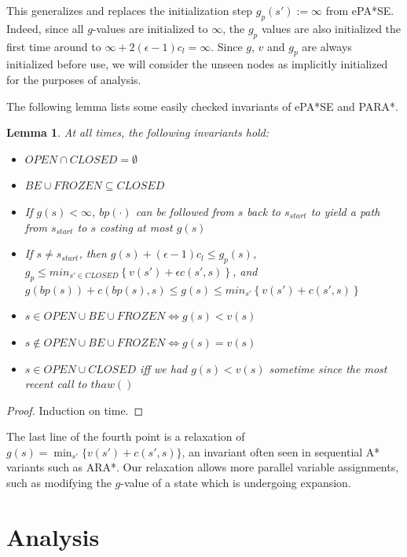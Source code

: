 \documentclass[letterpaper]{article}
\newtheorem{lemma}{Lemma}
\begin{document}
This generalizes and replaces the initialization step $g_p(s') := \infty$ from ePA*SE. Indeed, since all $g$-values are initialized to $\infty$, the $g_p$ values are also initialized the first time around to $\infty +2(\epsilon-1)c_l = \infty$. Since $g$, $v$ and $g_p$ are always initialized before use, we will consider the unseen nodes as implicitly initialized for the purposes of analysis.

The following lemma lists some easily checked invariants of ePA*SE and PARA*.

\begin{lemma}
\label{lem:prop}
At all times, the following invariants hold:
\begin{itemize}
\item $OPEN\cap CLOSED = \emptyset$
\item $BE\cup FROZEN \subseteq CLOSED$
\item If $g(s)<\infty$, $bp(\cdot)$ can be followed from $s$ back to $s_{start}$ to yield a path from $s_{start}$ to $s$ costing at most $g(s)$
\item If $s\ne s_{start}$, then $g(s) + (\epsilon-1)c_l \le g_p(s)$,
\\$g_p \le min_{s'\in CLOSED}\left\{v(s') + \epsilon c(s',s)\right\}$, and
\\$g(bp(s)) + c(bp(s),s) \le g(s) \le min_{s'}\left\{v(s') + c(s',s)\right\}$
\item $s\in OPEN\cup BE\cup FROZEN \Leftrightarrow g(s) < v(s)$
\item $s\notin OPEN\cup BE\cup FROZEN \Leftrightarrow g(s) = v(s)$
\item $s\in OPEN\cup CLOSED$ iff we had $g(s)<v(s)$ sometime since the most recent call to $thaw()$
\end{itemize}
\end{lemma}

\begin{proof}
Induction on time.
\end{proof}

The last line of the fourth point is a relaxation of $g(s) = \min_{s'}\{v(s') + c(s',s)\}$, an invariant often seen in sequential A* variants such as ARA*. Our relaxation allows more parallel variable assignments, such as modifying the $g$-value of a state which is undergoing expansion.

\section{Analysis}
\end{document}
